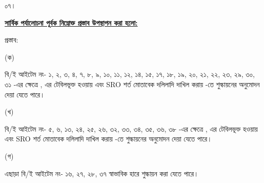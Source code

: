 \documentclass[12pt]{article}
\begin{document}
\begin{minipage}[t]{0.05\linewidth}
০৭।
\end{minipage}
\begin{minipage}[t]{0.95\linewidth}
\underline{\textbf{সার্বিক পর্যালোচনা পূর্বক নিম্নোক্ত প্রস্তাব উপস্থাপন করা হলো:}}
\end{minipage}
\begin{minipage}[t]{0.05\linewidth}
\hspace{0em}
\end{minipage}
\begin{minipage}[t]{0.95\linewidth}
প্রস্তাব:
\end{minipage}
\begin{minipage}[t]{0.05\linewidth}
\hspace{1em}
\end{minipage}
\begin{minipage}[t]{0.05\linewidth}
(ক)
\end{minipage}
\begin{minipage}[t]{0.90\linewidth}
বি/ই আইটেম নং-
১, ২, ৩, ৪,
৭, ৮, ৯, ১০, ১১, ১২, ১৪,
১৫, ১৭, ১৮, ১৯, ২০, ২১, ২২, ২৩,
২৯, ৩০, ৩১
-এর ক্ষেত্রে
{\srootz}, {\srootzd}
এর টেবিলভূক্ত হওয়ায়
এবং SRO শর্ত মোতাবেক
দলিলাদি দাখিল করায়
{\cpcofs}
-তে শুল্কায়নের অনুমোদন দেয়া
যেতে পারে।
\\
\end{minipage}
\begin{minipage}[t]{0.05\linewidth}
\hspace{1em}
\end{minipage}
\begin{minipage}[t]{0.05\linewidth}
(খ)
\end{minipage}
\begin{minipage}[t]{0.90\linewidth}
বি/ই আইটেম নং-
৫, ৬, ১৩, ২৪, ২৫, ২৬,
৩২, ৩৩, ৩৪, ৩৫, ৩৬, ৩৮
-এর ক্ষেত্রে
{\srooot}, {\sroootd}
এর টেবিলভূক্ত হওয়ায়
এবং SRO শর্ত মোতাবেক
দলিলাদি দাখিল করায়
{\cpcttz}
-তে শুল্কায়নের অনুমোদন দেয়া
যেতে পারে।
\\
\end{minipage}
\begin{minipage}[t]{0.05\linewidth}
\hspace{1em}
\end{minipage}
\begin{minipage}[t]{0.05\linewidth}
(গ)
\end{minipage}
\begin{minipage}[t]{0.90\linewidth}
এছাড়া বি/ই আইটেম নং-
১৬, ২৭, ২৮, ৩৭
স্বাভাবিক হারে শুল্কায়ন করা
যেতে পারে।
\\
\end{minipage}
\end{document}
